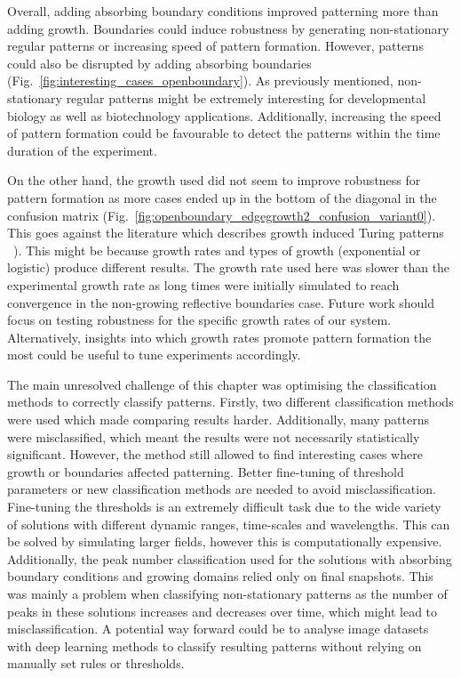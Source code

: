 Overall, adding absorbing boundary conditions improved patterning more than adding growth.
Boundaries could induce robustness by generating non-stationary regular patterns or increasing speed of pattern formation.
However, patterns could also be disrupted by adding absorbing boundaries (Fig.~\ref{fig:interesting_cases_openboundary}).
As previously mentioned, non-stationary regular patterns might be extremely interesting for developmental biology as well as biotechnology applications.
Additionally, increasing the speed of pattern formation could be favourable to detect the patterns within the time duration of the experiment.

On the other hand, the growth used did not seem to improve robustness for pattern formation as more cases ended up in the bottom of the diagonal in the confusion matrix (Fig.~\ref{fig:openboundary_edgegrowth2_confusion_variant0}).
This goes against the literature which describes growth induced Turing patterns ~\parencite{gaffney2010}).
This might be because growth rates and types of growth (exponential or logistic) produce different results.
The growth rate used here was slower than the experimental growth rate as long times were initially simulated to reach convergence in the non-growing reflective boundaries case.
Future work should focus on testing robustness for the specific growth rates of our system.
Alternatively, insights into which growth rates promote pattern formation the most could be useful to tune experiments accordingly.

The main unresolved challenge of this chapter was optimising the classification methods to correctly classify patterns.
Firstly, two different classification methods were used which made comparing results harder.
Additionally, many patterns were misclassified, which meant the results were not necessarily statistically significant.
However, the method still allowed to find interesting cases where growth or boundaries affected patterning.
Better fine-tuning of threshold parameters or new classification methods are needed to avoid misclassification.
Fine-tuning the thresholds is an extremely difficult task due to the wide variety of solutions with different dynamic ranges, time-scales and wavelengths.
This can be solved by simulating larger fields, however this is computationally expensive.
Additionally, the peak number classification used for the solutions with absorbing boundary conditions and growing domains relied only on final snapshots.
This was mainly a problem when classifying non-stationary patterns as the number of peaks in these solutions increases and decreases over time, which might lead to misclassification.
A potential way forward could be to analyse image datasets with deep learning methods to classify resulting patterns without relying on manually set rules or thresholds.